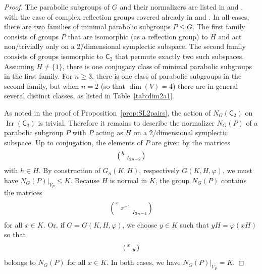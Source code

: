 \documentclass[10pt,a4paper]{amsart}
\DeclareMathOperator{\Irr}{Irr}
\renewcommand{\phi}{\varphi}
\begin{document}
\begin{proof}
  The parabolic subgroups of \(G\) and their normalizers are listed in \cite[Sect.~4]{GRS25} and \cite[Sect.~3]{RS26}, with the case of complex reflection groups covered already in \cite[Sect.~6.1]{OT92} and \cite{MT18}.
  In all cases, there are two families of minimal parabolic subgroups \(P\leqslant G\).
  The first family consists of groups \(P\) that are isomorphic (as a reflection group) to \(H\) and act non\-/trivially only on a 2\=/dimensional symplectic subspace.
  The second family consists of groups isomorphic to \(\mathsf C_2\) that permute exactly two such subspaces.
  Assuming \(H\neq \{1\}\), there is one conjugacy class of minimal parabolic subgroups in the first family.
  For \(n \geqslant 3\), there is one class of parabolic subgroups in the second family, but when $n = 2$ (so that $\dim(V) = 4$) there are in general several distinct classes, as listed in Table~\ref{tab:dim2a1}.

  As noted in the proof of Proposition~\ref{prop:SL2pairs}, the action of $N_G(\mathsf C_2)$ on $\Irr(\mathsf C_2)$ is trivial. Therefore it remains to describe the normalizer \(N_G(P)\) of a parabolic subgroup \(P\) with \(P\) acting as \(H\) on a 2\=/dimensional symplectic subspace.
  Up to conjugation, the elements of \(P\) are given by the matrices \[\begin{psmallmatrix} h & \\ & I_{2n - 2} \end{psmallmatrix}\] with \(h\in H\).
  By construction of \(G_n(K, H)\), respectively \(G(K, H, \phi)\), we must have \(N_G(P)|_{V_P} \leqslant K\).
  Because \(H\) is normal in \(K\), the group \(N_G(P)\) contains the matrices \[\begin{psmallmatrix} x & & \\ & x^{-1} & \\ & & I_{2n - 4}\end{psmallmatrix}\]
  for all $x \in K$. Or, if \(G = G(K, H, \phi)\),  we choose $y \in K$ such that $y H = \phi(x H)$ so that \[\begin{psmallmatrix} x & \\ & y\end{psmallmatrix}\] belongs to $N_G(P)$ for all \(x\in K\). In both cases, we have \(N_G(P)|_{V_P} = K\).
\end{proof}
\end{document}
